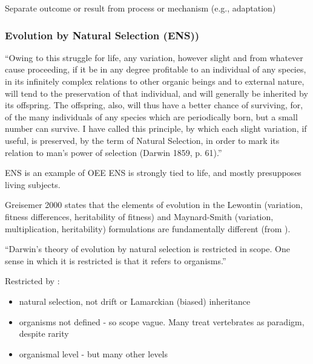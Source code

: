 
Separate outcome or result from process or mechanism (e.g., adaptation)


\subsubsection{Evolution by Natural Selection (ENS))}\label{ens-evolution-by-natural-selection}

``Owing to this struggle for life, any variation, however slight and
from whatever cause proceeding, if it be in any degree profitable to
an individual of any species, in its infinitely complex relations to
other organic beings and to external nature, will tend to the
preservation of that individual, and will generally be inherited by
its offspring. The offspring, also, will thus have a better chance
of surviving, for, of the many individuals of any species which are
periodically born, but a small number can survive. I have called
this principle, by which each slight variation, if useful, is
preserved, by the term of Natural Selection, in order to mark its
relation to man's power of selection (Darwin 1859, p. 61).'' \autocite{Griesemer2005}

ENS is an example of OEE
ENS is strongly tied to life, and mostly presupposes living subjects.

Greisemer 2000 states that the elements of evolution in the Lewontin (variation, fitness differences, heritability of fitness) and Maynard-Smith (variation, multiplication, heritability) formulations are fundamentally different (from \autocite{Vasas2015}).


``Darwin's theory of evolution by natural selection is restricted in scope. One sense in which it is restricted is that it refers to organisms.'' \autocite{Griesemer2005}

Restricted by \autocite{Griesemer2005}:
\begin{itemize}
	\item natural selection, not drift or Lamarckian (biased) inheritance
	\item organisms not defined - so scope vague. Many treat vertebrates as paradigm, despite rarity
	\item organismal level - but many other levels
\end{itemize}

